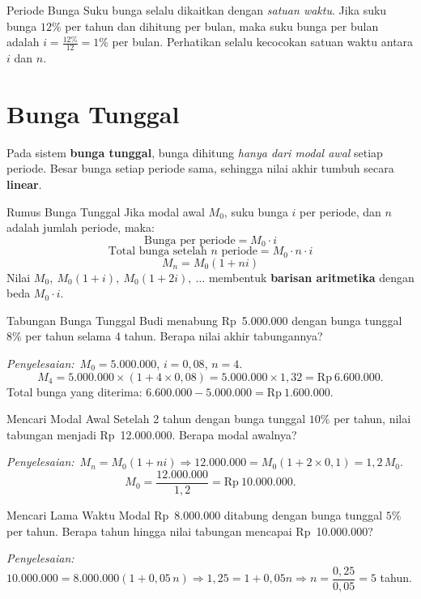 \documentclass[11pt,a4paper]{report}
\theoremstyle{gaya}
\newcommand{\jawab}{\par\smallskip\noindent\textit{\textcolor{oranye}{Penyelesaian:}}\ }
\begin{document}
\begin{konsep}{Periode Bunga}
Suku bunga selalu dikaitkan dengan \emph{satuan waktu}. Jika suku bunga $12\%$ per tahun dan dihitung per bulan, maka suku bunga per bulan adalah $i = \frac{12\%}{12} = 1\%$ per bulan. Perhatikan selalu kecocokan satuan waktu antara $i$ dan $n$.
\end{konsep}

\section{Bunga Tunggal}

Pada sistem \textbf{bunga tunggal}, bunga dihitung \emph{hanya dari modal awal} setiap periode. Besar bunga setiap periode sama, sehingga nilai akhir tumbuh secara \textbf{linear}.

\begin{konsep}{Rumus Bunga Tunggal}
Jika modal awal $M_0$, suku bunga $i$ per periode, dan $n$ adalah jumlah periode, maka:
\[
  \text{Bunga per periode} = M_0 \cdot i
\]
\[
  \text{Total bunga setelah } n \text{ periode} = M_0 \cdot n \cdot i
\]
\[
  \boxed{M_n = M_0(1 + ni)}
\]
Nilai $M_0,\ M_0(1+i),\ M_0(1+2i),\ \ldots$ membentuk \textbf{barisan aritmetika} dengan beda $M_0 \cdot i$.
\end{konsep}

\begin{contoh}{Tabungan Bunga Tunggal}
Budi menabung Rp~5.000.000 dengan bunga tunggal $8\%$ per tahun selama 4 tahun. Berapa nilai akhir tabungannya?

\jawab $M_0 = 5.000.000$, $i = 0{,}08$, $n = 4$.
\[
  M_4 = 5.000.000 \times (1 + 4 \times 0{,}08) = 5.000.000 \times 1{,}32 = \text{Rp}\ 6.600.000.
\]
Total bunga yang diterima: $6.600.000 - 5.000.000 = \text{Rp}\ 1.600.000$.
\end{contoh}

\begin{contoh}{Mencari Modal Awal}
Setelah 2 tahun dengan bunga tunggal $10\%$ per tahun, nilai tabungan menjadi Rp~12.000.000. Berapa modal awalnya?

\jawab $M_n = M_0(1+ni) \Rightarrow 12.000.000 = M_0(1 + 2 \times 0{,}1) = 1{,}2\,M_0$.
\[
  M_0 = \frac{12.000.000}{1{,}2} = \text{Rp}\ 10.000.000.
\]
\end{contoh}

\begin{contoh}{Mencari Lama Waktu}
Modal Rp~8.000.000 ditabung dengan bunga tunggal $5\%$ per tahun. Berapa tahun hingga nilai tabungan mencapai Rp~10.000.000?

\jawab $10.000.000 = 8.000.000(1 + 0{,}05\,n) \Rightarrow 1{,}25 = 1 + 0{,}05n \Rightarrow n = \dfrac{0{,}25}{0{,}05} = 5$ tahun.
\end{contoh}
\end{document}
